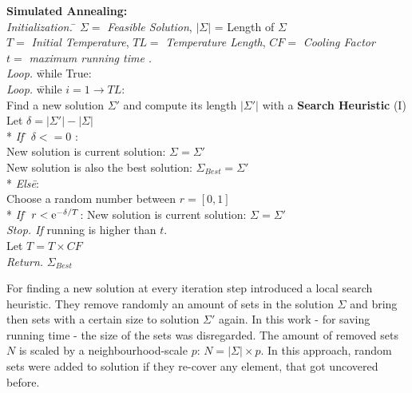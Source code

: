 \documentclass[a4paper]{article}
\begin{document}
\begin{tabbing}
\textbf{Simulated Annealing:}\cite{Jacobs1995} \\
\textit{Initialization.} \= $\Sigma = $ \textit{Feasible Solution}, $|\Sigma|$ = Length of $\Sigma$ \\
                        \> $T = $ \textit{Initial Temperature}, $TL = $ \textit{Temperature Length}, $CF = $ \textit{Cooling Factor} \\
                        \> $t = $ \textit{maximum running time .}\\
\textit{Loop.} \= while True: \\
\>\textit{Loop.} \= while $i = 1 \xrightarrow{} TL$: \\
\>\> Find a new solution $\Sigma'$ and compute its length $|\Sigma'|$ with a \textbf{Search Heuristic}  (I) \\
\>\> Let $\delta = |\Sigma'| - |\Sigma|$ \\
\>\> * \textit{If} \= $\delta <= 0$ : \\
\>\>               \> New solution is current solution: $\Sigma = \Sigma'$\\
\>\>               \> New solution is also the best solution: $\Sigma_{Best} = \Sigma'$ \\
\>\> * \textit{Els\=e}:  \\
\>\>               \> Choose a random number between $r = [0,1]$ \\
\>\>              \>* \textit{If} \= $r < {\rm e}^{-\delta/T}$: New solution is current solution: $\Sigma = \Sigma'$\\
\>\textit{Stop. If} running is higher than $t$. \\
\>Let $T = T \times CF$ \\
\textit{Return.} $\Sigma_{Best}$
\end{tabbing}

For finding a new solution at every iteration step \citeauthor*{Jacobs1995} introduced a local search heuristic. They remove randomly an amount of sets in the solution $\Sigma$ and bring then sets with a certain size to solution $\Sigma'$ again. In this work - for saving running time - the size of the sets was disregarded. The amount of removed sets $N$ is scaled by a neighbourhood-scale $p$: $N = |\Sigma| \times p $. In this approach, random sets were added to solution if they re-cover any element, that got uncovered before.
\end{document}
